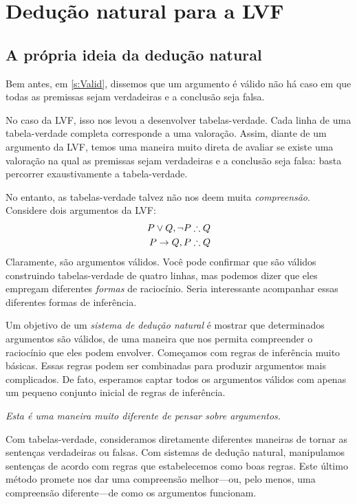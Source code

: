 \part{Dedução natural para a LVF}
\label{ch.NDTFL}

\chapter{A própria ideia da dedução natural}\label{s:NDVeryIdea}

Bem antes, em \cref{s:Valid}, dissemos que um argumento é válido \ifeff{} não há caso em que todas as premissas sejam verdadeiras e a conclusão seja falsa.

No caso da LVF, isso nos levou a desenvolver tabelas-verdade. Cada linha de uma tabela-verdade completa corresponde a uma valoração. Assim, diante de um argumento da LVF, temos uma maneira muito direta de avaliar se existe uma valoração na qual as premissas sejam verdadeiras e a conclusão seja falsa: basta percorrer exaustivamente a tabela-verdade.

No entanto, as tabelas-verdade talvez não nos deem muita \emph{compreensão}. Considere dois argumentos da LVF:
\begin{align*}
P \eor Q, \enot P & \therefore Q\\
P \eif Q, P & \therefore Q
\end{align*}
Claramente, são argumentos válidos. Você pode confirmar que são válidos construindo tabelas-verdade de quatro linhas, mas podemos dizer que eles empregam diferentes \emph{formas} de raciocínio. Seria interessante acompanhar essas diferentes formas de inferência.

Um objetivo de um \emph{sistema de dedução natural} é mostrar que determinados argumentos são válidos, de uma maneira que nos permita compreender o raciocínio que eles podem envolver. Começamos com regras de inferência muito básicas. Essas regras podem ser combinadas para produzir argumentos mais complicados. De fato, esperamos captar todos os argumentos válidos com apenas um pequeno conjunto inicial de regras de inferência.

\emph{Esta é uma maneira muito diferente de pensar sobre argumentos.}

Com tabelas-verdade, consideramos diretamente diferentes maneiras de tornar as sentenças verdadeiras ou falsas. Com sistemas de dedução natural, manipulamos sentenças de acordo com regras que estabelecemos como boas regras. Este último método promete nos dar uma compreensão melhor---ou, pelo menos, uma compreensão diferente---de como os argumentos funcionam.

